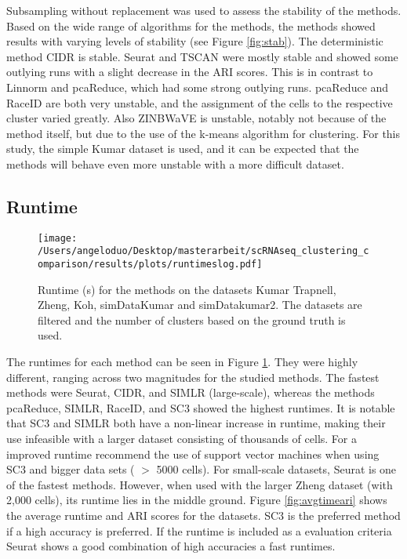 \documentclass[12pt, a4paper]{article}\usepackage[]{graphicx}\usepackage[]{color}
\begin{document}
Subsampling without replacement was used to assess the stability of the methods. Based on the wide range of algorithms for the methods, the methods showed results with varying levels of stability (see Figure \ref{fig:stab}). The deterministic method CIDR is stable. Seurat and TSCAN were mostly stable and showed some outlying runs with a slight decrease in the ARI scores. This is in contrast to Linnorm and pcaReduce, which had some strong outlying runs. pcaReduce and RaceID are both very unstable, and the assignment of the cells to the respective cluster varied greatly. Also  ZINBWaVE is unstable, notably not because of the method itself, but  due to the use of the k-means algorithm for clustering. For this study, the simple Kumar dataset is used, and it can be expected that the methods will behave even more unstable with a more difficult dataset.

 
\newpage

\subsection{Runtime} 

\begin{figure}[htp]
\begin{center}
\texttt{[image: /Users/angeloduo/Desktop/masterarbeit/scRNAseq\_clustering\_comparison/results/plots/runtimeslog.pdf]}
\caption{Runtime (s) for the methods on the datasets Kumar Trapnell, Zheng, Koh, simDataKumar and simDatakumar2. The datasets are filtered and the number of clusters based on the ground truth is used.}
\label{fig:runtimelog}
\end{center}
\end{figure}


The runtimes for each method can be seen in Figure \ref{fig:runtimelog}. They were highly different, ranging across two magnitudes for the studied methods. The fastest methods were Seurat, CIDR, and SIMLR (large-scale), whereas the methods pcaReduce, SIMLR, RaceID, and SC3 showed the highest runtimes. It is notable that SC3 and SIMLR both have a non-linear increase in runtime, making their use infeasible with a larger dataset consisting of thousands of cells. For a improved runtime \citet{kiselev2017sc3} recommend the use of support vector machines when using SC3 and bigger data sets ( $>$ 5000 cells). For small-scale datasets, Seurat is one of the fastest methods. However, when used with the larger Zheng dataset (with 2,000 cells), its runtime lies in the middle ground.
Figure \ref{fig:avgtimeari} shows the average runtime and ARI scores for the datasets. SC3 is the preferred method if a high accuracy is preferred. If the runtime is included as a evaluation criteria Seurat shows a good combination of high accuracies a fast runtimes.  
\end{document}
